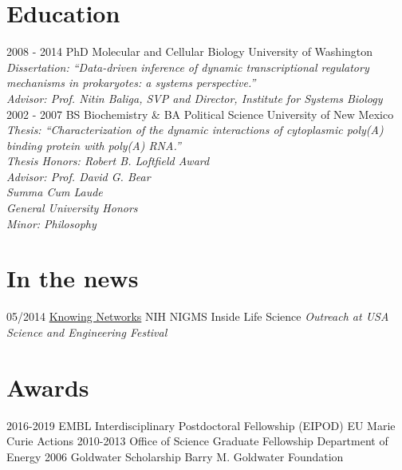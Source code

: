 \documentclass[]{friggeri-cv}
\begin{document}
\section{Education}
\begin{entrylist}
  \entry
    {2008 - 2014}
    {PhD Molecular and Cellular Biology}
    {University of Washington}
    {\emph{Dissertation: ``Data-driven inference of dynamic transcriptional regulatory mechanisms in prokaryotes: a systems perspective.''}\\
    \emph{Advisor: Prof. Nitin Baliga, SVP and Director, Institute for Systems Biology}\\}
  \entry
    {2002 - 2007}
    {BS Biochemistry \& BA Political Science}
    {University of New Mexico}
    {\emph{Thesis: ``Characterization of the dynamic interactions of cytoplasmic poly(A) binding protein with poly(A) RNA.''}\\
    \textit{Thesis Honors: Robert B. Loftfield Award}\\
    \emph{Advisor: Prof. David G. Bear}\\
    \textit{Summa Cum Laude}\\
    \textit{General University Honors}\\
    \textit{Minor: Philosophy}}
\end{entrylist}
\newpage
\section{In the news}
\begin{entrylist}
  \entry
    {05/2014}
    {\href{http://publications.nigms.nih.gov/insidelifescience/knowing-networks.html}{Knowing Networks}}
    {NIH NIGMS Inside Life Science}
    {\emph{Outreach at USA Science and Engineering Festival}}
\end{entrylist}

\section{Awards}
\begin{entrylist}
   \entry
    {2016-2019}
    {EMBL Interdisciplinary Postdoctoral Fellowship (EIPOD)}
    {EU Marie Curie Actions}
    {}
  \entry
    {2010-2013}
    {Office of Science Graduate Fellowship}
    {Department of Energy}
    {}
   \entry
    {2006}
    {Goldwater Scholarship}
    {Barry M. Goldwater Foundation}
    {}
\end{entrylist}
\end{document}
